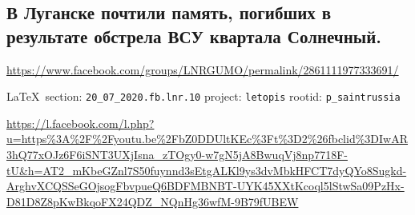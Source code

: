  
 

\subsection{В Луганске почтили память, погибших в результате обстрела ВСУ квартала Солнечный.}
\label{sec:20_07_2020.fb.lnr.10}
\url{https://www.facebook.com/groups/LNRGUMO/permalink/2861111977333691/}
  
\vspace{0.5cm}
{\small\LaTeX~section: \verb|20_07_2020.fb.lnr.10| project: \verb|letopis| rootid: \verb|p_saintrussia|}
\vspace{0.5cm}

\url{https://l.facebook.com/l.php?u=https%3A%2F%2Fyoutu.be%2FbZ0DDUltKEc%3Ft%3D2%26fbclid%3DIwAR3hQ77xOJz6F6iSNT3UXjIsna_zTOgy0-w7gN5jA8BwuqVj8np7718F-tU&h=AT2_mKbeGZnl7S50fuynnd3sEtgALKl9ys3dvMbkHFCT7dyQYo8Sugkd-ArghvXCQSSeGOjsogFbvpueQ6BDFMBNBT-UYK45XXtKcoql5lStwSa09PzHx-D81D8Z8pKwBkqoFX24QDZ_NQnHg36wfM-9B79fUBEW}
  
